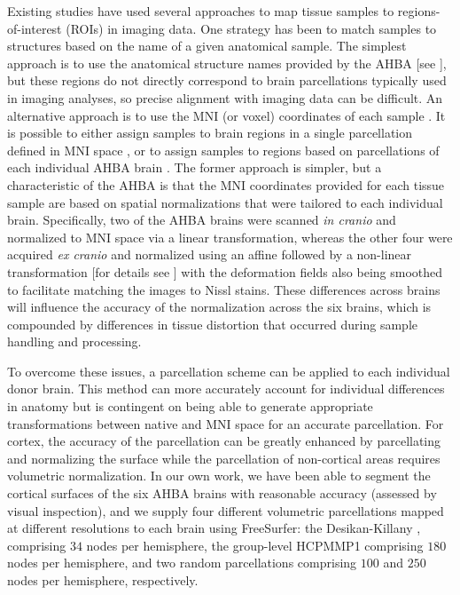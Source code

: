 \documentclass[10pt,A4]{article}
\begin{document}
Existing studies have used several approaches to map tissue samples to regions-of-interest (ROIs) in imaging data.
One strategy has been to match samples to structures based on the name of a given anatomical sample. The simplest approach is to use the anatomical structure names provided by the AHBA [see \citet{AHBAdoc,Tan2013,Myers2015a,Chen2016,Kirsch2016a,Hecker2017,Lee2017a,Negi2017}], but these regions do not directly correspond to brain parcellations typically used in imaging analyses, so precise alignment with imaging data can be difficult. An alternative approach is to use the MNI (or voxel) coordinates of each sample \citep{Goyal2014,Cioli2014b,French2015,Richiardi2015,Komorowski2016,Krienen2016,Rizzo2016,Burt2018,Parkes2017,Romme2017,Shin2018,Anderson2018,Romero-Garcia2018}.
It is possible to either assign samples to brain regions in a single parcellation defined in MNI space \citep{Krienen2016,Keo2017,Parkes2017,Romme2017}, or to assign samples to regions based on parcellations of each individual AHBA brain \citep{Romero-Garcia2018}. The former approach is simpler, but a characteristic of the AHBA is that the MNI coordinates provided for each tissue sample are based on spatial normalizations that were tailored to each individual brain. Specifically, two of the AHBA brains were scanned \textit{in cranio} and normalized to MNI space via a linear transformation, whereas the other four were acquired \textit{ex cranio} and normalized using an affine followed by a non-linear transformation [for details see \citep{AHBAdoc}] with the deformation fields also being smoothed to facilitate matching the images to Nissl stains. These differences across brains will influence the accuracy of the normalization across the six brains, which is compounded by differences in tissue distortion that occurred during sample handling and processing.

To overcome these issues, a parcellation scheme can be applied to each individual donor brain. This method can more accurately account for individual differences in anatomy but is contingent on being able to generate appropriate transformations between native and MNI space for an accurate parcellation. For cortex, the accuracy of the parcellation can be greatly enhanced by parcellating and normalizing the surface while the parcellation of non-cortical areas requires volumetric normalization. In our own work, we have been able to segment the cortical surfaces of the six AHBA brains with reasonable accuracy (assessed by visual inspection), and we supply four different volumetric parcellations mapped at different resolutions to each brain using FreeSurfer: the Desikan-Killany \citep{Desikan2006}, comprising $34$ nodes per hemisphere, the group-level HCPMMP1 \citep{Glasser2016} comprising $180$ nodes per hemisphere, and two random parcellations comprising $100$ and $250$ nodes per hemisphere, respectively.
\end{document}
